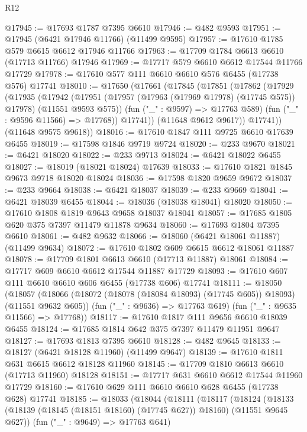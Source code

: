 \begin{lexlean}{R12}
\begin{coremodule}
{{{{{{{{{{{{{{{{{{{{{{{{{{{{{{{{{{{{{{{{{{{{{{{{{{{{{{{{{{{{{{{{{{{{{{{{{{{{{{{{{{@17945 := @17693 @1787 @7395 @6610
@17946 := @482 @9593
@17951 := @17945 (@6421 @17946 @11766) (@11499 @9595)
@17957 := @17610 @1785 @579 @6615 @6612 @17946 @11766
@17963 := @17709 @1784 @6613 @6610 (@17713 @11766) @17946
@17969 := @17717 @579 @6610 @6612 @17544 @11766 @17729
@17978 := @17610 @577 @111 @6610 @6610 @576 @6455 (@17738 @576) @17741
@18010 := @17650
    (@17661
      (@17845
        (@17851
          (@17862
            (@17929
              (@17935
                (@17942
                  (@17951
                    (@17957 (@17963 (@17969 @17978) (@17745 @575)) @17978)
                    (@11551 @9593 @575))
                  (fun ("_" : @9597) => @17763 @589)
                  (fun ("_" : @9596 @11566) => @17768))
                @17741))
            (@11648 @9612 @9617))
          @17741))
      (@11648 @9575 @9618))
@18016 := @17610 @1847 @111 @9725 @6610 @17639 @6455
@18019 := @17598 @1846 @9719 @9724
@18020 := @233 @9670
@18021 := @6421 @18020
@18022 := @233 @9713
@18024 := @6421 @18022 @6455
@18027 := @18019 (@18021 @18024) @17639
@18033 := @17610 @1821 @1845 @9673 @9718 @18020 @18024
@18036 := @17598 @1820 @9659 @9672
@18037 := @233 @9664
@18038 := @6421 @18037
@18039 := @233 @9669
@18041 := @6421 @18039 @6455
@18044 := @18036 (@18038 @18041) @18020
@18050 := @17610 @1808 @1819 @9643 @9658 @18037 @18041
@18057 := @17685 @1805 @620 @375 @7397 @11479 @11878 @9634
@18060 := @17693 @1804 @7395 @6610
@18061 := @482 @9632
@18066 := @18060 (@6421 @18061 @11887) (@11499 @9634)
@18072 := @17610 @1802 @609 @6615 @6612 @18061 @11887
@18078 := @17709 @1801 @6613 @6610 (@17713 @11887) @18061
@18084 := @17717 @609 @6610 @6612 @17544 @11887 @17729
@18093 := @17610 @607 @111 @6610 @6610 @606 @6455 (@17738 @606) @17741
@18111 := @18050
    (@18057
      (@18066 (@18072 (@18078 (@18084 @18093) (@17745 @605)) @18093) (@11551 @9632 @605))
      (fun ("_" : @9636) => @17763 @619)
      (fun ("_" : @9635 @11566) => @17768))
@18117 := @17610 @1817 @111 @9656 @6610 @18039 @6455
@18124 := @17685 @1814 @642 @375 @7397 @11479 @11951 @9647
@18127 := @17693 @1813 @7395 @6610
@18128 := @482 @9645
@18133 := @18127 (@6421 @18128 @11960) (@11499 @9647)
@18139 := @17610 @1811 @631 @6615 @6612 @18128 @11960
@18145 := @17709 @1810 @6613 @6610 (@17713 @11960) @18128
@18151 := @17717 @631 @6610 @6612 @17544 @11960 @17729
@18160 := @17610 @629 @111 @6610 @6610 @628 @6455 (@17738 @628) @17741
@18185 := @18033
    (@18044
      (@18111
        (@18117
          (@18124
            (@18133 (@18139 (@18145 (@18151 @18160) (@17745 @627)) @18160) (@11551 @9645 @627))
            (fun ("_" : @9649) => @17763 @641)
}}}}}}}}}}}}}}}}}}}}}}}}}}}}}}}}}}}}}}}}}}}}}}}}}}}}}}}}}}}}}}}}}}}}}}}}}}}}}}}}}}
\end{coremodule}
\end{lexlean}

